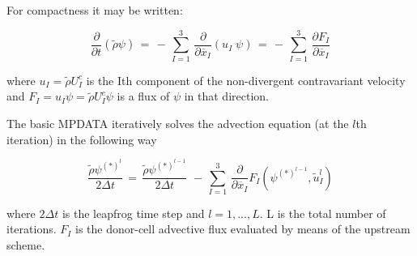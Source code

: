 \noindent For compactness it may be written:

\begin{equation}
\dfrac{\partial}{\partial t}(\tilde{\rho}\psi) \, =
 \, - \, \sum_{I=1}^{3} \, \dfrac{\partial }{\partial \overline{x}_I}
 (u_I \; \psi) \, =
 \, - \, \sum_{I=1}^{3} \, \dfrac{\partial F_I }{\partial \overline{x}_I}
\end{equation}

\noindent
 where $u_I = \tilde{\rho} U_{I}^{c}$ is the Ith component of the non-divergent
contravariant velocity and $F_I = u_I \psi = \tilde{\rho} U_{I}^{c} \psi$
is a flux of $\psi$ in that direction.

 The basic MPDATA
iteratively solves the advection equation (at the $l$th iteration) in the
following way

\begin{equation}
\dfrac{\tilde{\rho} \psi^{(*)^{l}}} {2 \Delta t} \, = \,
\dfrac{\tilde{\rho} \psi^{(*)^{l-1}}} {2 \Delta t} \,
 \, - \, \sum_{I=1}^{3} \,  \dfrac{\partial }{\partial \overline{x}_I}
F_I (\psi^{(*)^{l-1}} , \tilde{u}_I^{l} )
\end{equation}

\noindent
where $2\Delta t$ is the leapfrog time step and $l=1,...,L$.
 L is the total number of iterations.
$F_I$ is the donor-cell advective flux evaluated by means of the
upstream scheme.

